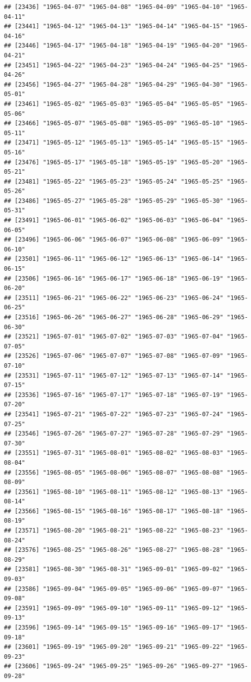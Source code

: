 \documentclass{article}\usepackage[]{graphicx}\usepackage[]{color}
\makeatletter
\newenvironment{kframe}{%
 \def\at@end@of@kframe{}%
 \ifinner\ifhmode%
  \def\at@end@of@kframe{\end{minipage}}%
  \begin{minipage}{\columnwidth}%
 \fi\fi%
 \def\FrameCommand##1{\hskip\@totalleftmargin \hskip-\fboxsep
 \colorbox{shadecolor}{##1}\hskip-\fboxsep
     \hskip-\linewidth \hskip-\@totalleftmargin \hskip\columnwidth}%
 \MakeFramed {\advance\hsize-\width
   \@totalleftmargin\z@ \linewidth\hsize
   \@setminipage}}%
 {\par\unskip\endMakeFramed%
 \at@end@of@kframe}
\newenvironment{knitrout}{}{} %
\makeatother
\begin{document}
\begin{description}
\begin{knitrout}
\begin{kframe}
\begin{verbatim}
## [23436] "1965-04-07" "1965-04-08" "1965-04-09" "1965-04-10" "1965-04-11"
## [23441] "1965-04-12" "1965-04-13" "1965-04-14" "1965-04-15" "1965-04-16"
## [23446] "1965-04-17" "1965-04-18" "1965-04-19" "1965-04-20" "1965-04-21"
## [23451] "1965-04-22" "1965-04-23" "1965-04-24" "1965-04-25" "1965-04-26"
## [23456] "1965-04-27" "1965-04-28" "1965-04-29" "1965-04-30" "1965-05-01"
## [23461] "1965-05-02" "1965-05-03" "1965-05-04" "1965-05-05" "1965-05-06"
## [23466] "1965-05-07" "1965-05-08" "1965-05-09" "1965-05-10" "1965-05-11"
## [23471] "1965-05-12" "1965-05-13" "1965-05-14" "1965-05-15" "1965-05-16"
## [23476] "1965-05-17" "1965-05-18" "1965-05-19" "1965-05-20" "1965-05-21"
## [23481] "1965-05-22" "1965-05-23" "1965-05-24" "1965-05-25" "1965-05-26"
## [23486] "1965-05-27" "1965-05-28" "1965-05-29" "1965-05-30" "1965-05-31"
## [23491] "1965-06-01" "1965-06-02" "1965-06-03" "1965-06-04" "1965-06-05"
## [23496] "1965-06-06" "1965-06-07" "1965-06-08" "1965-06-09" "1965-06-10"
## [23501] "1965-06-11" "1965-06-12" "1965-06-13" "1965-06-14" "1965-06-15"
## [23506] "1965-06-16" "1965-06-17" "1965-06-18" "1965-06-19" "1965-06-20"
## [23511] "1965-06-21" "1965-06-22" "1965-06-23" "1965-06-24" "1965-06-25"
## [23516] "1965-06-26" "1965-06-27" "1965-06-28" "1965-06-29" "1965-06-30"
## [23521] "1965-07-01" "1965-07-02" "1965-07-03" "1965-07-04" "1965-07-05"
## [23526] "1965-07-06" "1965-07-07" "1965-07-08" "1965-07-09" "1965-07-10"
## [23531] "1965-07-11" "1965-07-12" "1965-07-13" "1965-07-14" "1965-07-15"
## [23536] "1965-07-16" "1965-07-17" "1965-07-18" "1965-07-19" "1965-07-20"
## [23541] "1965-07-21" "1965-07-22" "1965-07-23" "1965-07-24" "1965-07-25"
## [23546] "1965-07-26" "1965-07-27" "1965-07-28" "1965-07-29" "1965-07-30"
## [23551] "1965-07-31" "1965-08-01" "1965-08-02" "1965-08-03" "1965-08-04"
## [23556] "1965-08-05" "1965-08-06" "1965-08-07" "1965-08-08" "1965-08-09"
## [23561] "1965-08-10" "1965-08-11" "1965-08-12" "1965-08-13" "1965-08-14"
## [23566] "1965-08-15" "1965-08-16" "1965-08-17" "1965-08-18" "1965-08-19"
## [23571] "1965-08-20" "1965-08-21" "1965-08-22" "1965-08-23" "1965-08-24"
## [23576] "1965-08-25" "1965-08-26" "1965-08-27" "1965-08-28" "1965-08-29"
## [23581] "1965-08-30" "1965-08-31" "1965-09-01" "1965-09-02" "1965-09-03"
## [23586] "1965-09-04" "1965-09-05" "1965-09-06" "1965-09-07" "1965-09-08"
## [23591] "1965-09-09" "1965-09-10" "1965-09-11" "1965-09-12" "1965-09-13"
## [23596] "1965-09-14" "1965-09-15" "1965-09-16" "1965-09-17" "1965-09-18"
## [23601] "1965-09-19" "1965-09-20" "1965-09-21" "1965-09-22" "1965-09-23"
## [23606] "1965-09-24" "1965-09-25" "1965-09-26" "1965-09-27" "1965-09-28"

\end{verbatim}
\end{kframe}
\end{knitrout}
\end{description}
\end{document}
